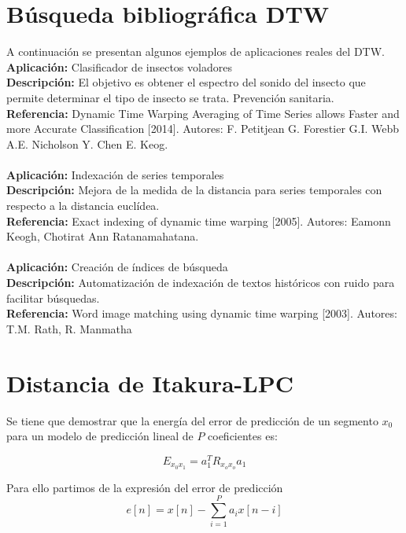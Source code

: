 \documentclass[12pt]{article}
\begin{document}
\pagebreak


\section{Búsqueda bibliográfica DTW}
A continuación se presentan algunos ejemplos de aplicaciones reales del DTW.\\

\textbf{Aplicación:} Clasificador de insectos voladores\\
\textbf{Descripción:} El objetivo es obtener el espectro del sonido del insecto que permite determinar el tipo de insecto se trata. Prevención sanitaria.\\
\textbf{Referencia:} Dynamic Time Warping Averaging of Time Series allows Faster and more Accurate Classification [2014]. Autores: F. Petitjean G. Forestier G.I. Webb A.E. Nicholson Y. Chen E. Keog.\\\\

\textbf{Aplicación:} Indexación de series temporales\\
\textbf{Descripción:} Mejora de la medida de la distancia para series temporales con respecto a la distancia euclídea.\\
\textbf{Referencia:} Exact indexing of dynamic time warping [2005]. Autores: Eamonn Keogh, Chotirat Ann Ratanamahatana.\\\\

\textbf{Aplicación:} Creación de índices de búsqueda\\
\textbf{Descripción:} Automatización de indexación de textos históricos con ruido para facilitar búsquedas.\\
\textbf{Referencia:} Word image matching using dynamic time warping [2003]. Autores: T.M. Rath, R. Manmatha\\


\section{Distancia de Itakura-LPC}
Se tiene que demostrar que la energía del error de predicción de un segmento $x_0$ para un modelo de predicción lineal de $P$ coeficientes es:

$$
E_{x_0x_1} = a_1^TR_{x_ox_o}a_1
$$

Para ello partimos de la expresión del error de predicción
\begin{equation}
e[n] = x[n]-\sum_{i=1}^{P}a_ix[n-i]
\end{equation}
\end{document}
